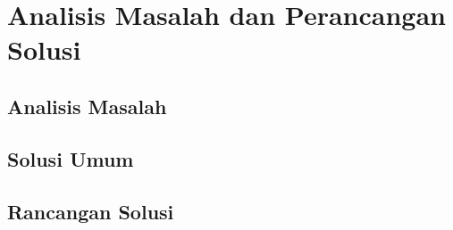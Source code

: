 \chapter{Analisis Masalah dan Perancangan Solusi}

\section{Analisis Masalah}
\blindtext

\section{Solusi Umum}
\blindtext

\section{Rancangan Solusi}
\blindtext